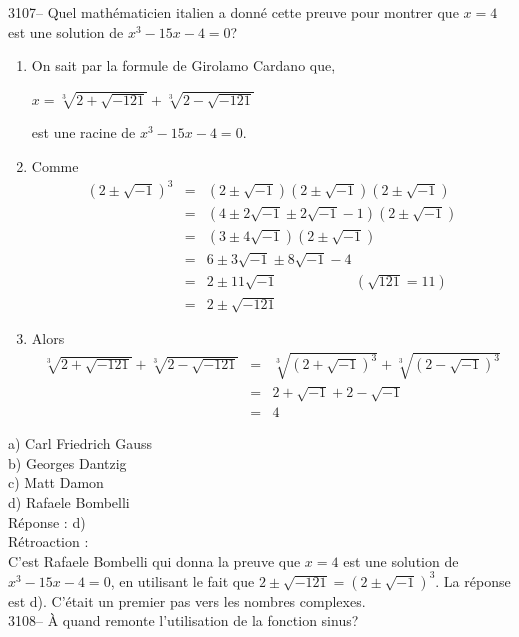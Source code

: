\documentclass[letterpaper, 12pt]{article}
\begin{document}
3107-- Quel math\'ematicien italien a donn\'e cette preuve pour montrer que $x = 4$ est une solution de $x^{3} - 15x - 4 = 0$?
\begin{enumerate}
\item On sait par la formule de Girolamo Cardano que,
\begin{center}
$x = \sqrt[3]{2 + \sqrt{-121}} + \sqrt[3]{2 - \sqrt{-121}}$
\end{center}
est une racine de $x^{3} -15x - 4 = 0$.
\item Comme
\begin{eqnarray*}
(2 \pm \sqrt{-1})^{3} &=& (2 \pm \sqrt{-1})(2 \pm \sqrt{-1})(2 \pm \sqrt{-1})\\
&=& (4 \pm 2\sqrt{-1} \pm 2\sqrt{-1} - 1)(2 \pm \sqrt{-1})\\
&=& (3 \pm 4\sqrt{-1})(2 \pm \sqrt{-1})\\
&=& 6 \pm 3\sqrt{-1} \pm 8\sqrt{-1} - 4\\
&=& 2 \pm 11\sqrt{-1} \ \ \ \ \ \ \ \ \ \ \ \ \ \ \ \ \ \ \ \ \ \ \ \ \ (\sqrt{121} = 11)\\
&=& 2 \pm \sqrt{-121}
\end{eqnarray*}
\item Alors
\begin{eqnarray*}
\sqrt[3]{2 + \sqrt{-121}} + \sqrt[3]{2 - \sqrt{-121}} &=& \sqrt[3]{(2 + \sqrt{-1})^{3}} + \sqrt[3]{(2 - \sqrt{-1})^{3}}\\
&=& 2 + \sqrt{-1} + 2 - \sqrt{-1}\\
&=& 4
\end{eqnarray*}
\end{enumerate}

a) Carl Friedrich Gauss\\
b) Georges Dantzig\\
c) Matt Damon\\
d) Rafaele Bombelli\\

R\'eponse : d)\\

R\'etroaction :\\
C'est Rafaele Bombelli qui donna la preuve que $x = 4$ est une solution de $x^{3} - 15x - 4 = 0$, en utilisant le fait que $2 \pm \sqrt{-121} = (2 \pm \sqrt{-1})^{3}$. La r\'eponse est d). C'\'etait un premier pas vers les nombres complexes.\\



3108-- \`A quand remonte l'utilisation de la fonction sinus?\\
\end{document}
